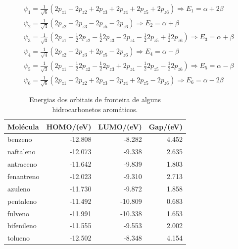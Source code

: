 \begin{equation}
\label{wavefunctions}
\begin{split}
    \psi_1 = \frac{1}{\sqrt{6}}(2p_{z1} + 2p_{z2} + 2p_{z3} + 2p_{z4} + 2p_{z5} + 2p_{z6}) \Longrightarrow E_1 = \alpha + 2\beta \\[0.35cm]
    \psi_2 = \frac{1}{\sqrt{4}}(2p_{z2} + 2p_{z3} - 2p_{z5} - 2p_{z6}) \Longrightarrow E_2 = \alpha + \beta \\[0.35cm]
   \psi_3 = \frac{1}{\sqrt{3}}(2p_{z1} + \frac{1}{2} 2p_{z2} - \frac{1}{2} 2p_{z3} - 2p_{z4} - \frac{1}{2} 2p_{z5} + \frac{1}{2} 2p_{z6}) \Longrightarrow E_3 = \alpha + \beta \\[0.35cm]
     \psi_4 = \frac{1}{\sqrt{4}}(2p_{z2} - 2p_{z3} + 2p_{z5} - 2p_{z6}) \Longrightarrow E_4 = \alpha - \beta \\[0.35cm]
      \psi_5 = \frac{1}{\sqrt{3}}(2p_{z1} - \frac{1}{2} 2p_{z2} - \frac{1}{2} 2p_{z3} + 2p_{z4} - \frac{1}{2} 2p_{z5} - \frac{1}{2} 2p_{z6}) \Longrightarrow E_5 = \alpha - \beta \\[0.35cm]
      \psi_6 = \frac{1}{\sqrt{6}}(2p_{z1} - 2p_{z2} + 2p_{z3} - 2p_{z4} +  2p_{z5} -  2p_{z6}) \Longrightarrow E_6 = \alpha - 2\beta 
\end{split}
\end{equation}


\begin{table}[htb]
	\centering
	\caption{\label{qua:Quadro_1} Energias dos orbitais de fronteira de alguns hidrocarbonetos aromáticos.}	
	\begin{tabular}{lrrr}
		\toprule
		\textbf{Molécula} & \textbf{HOMO/(eV)} & \textbf{LUMO/(eV)} & \textbf{Gap/(eV)}
		\\ 
		\midrule
        benzeno & -12.808 & -8.282 & 4.452 \\
        naftaleno & -12.073 & -9.338 & 2.635 \\
        antraceno & -11.642 & -9.839 & 1.803 \\
        fenantreno & -12.023 & -9.310 & 2.713 \\
        azuleno & -11.730 & -9.872 & 1.858 \\
        pentaleno & -11.492 & -10.809 & 0.683 \\
        fulveno & -11.991 & -10.338 & 1.653 \\
        bifenileno & -11.555 & -9.553 & 2.002 \\
        tolueno & -12.502 & -8.348 & 4.154 \\
    \bottomrule
	\end{tabular}
\end{table}


